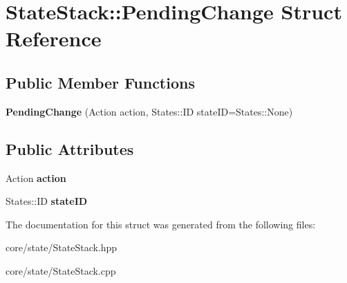 \hypertarget{structStateStack_1_1PendingChange}{\section{\-State\-Stack\-:\-:\-Pending\-Change \-Struct \-Reference}
\label{structStateStack_1_1PendingChange}
}
\subsection*{\-Public \-Member \-Functions}
\begin{DoxyCompactItemize}
\item 
\hypertarget{structStateStack_1_1PendingChange_adf295f13761e75276203d45bd34d984a_adf295f13761e75276203d45bd34d984a}{{\bfseries \-Pending\-Change} (\-Action action, \-States\-::\-I\-D state\-I\-D=\-States\-::\-None)}\label{structStateStack_1_1PendingChange_adf295f13761e75276203d45bd34d984a_adf295f13761e75276203d45bd34d984a}

\end{DoxyCompactItemize}
\subsection*{\-Public \-Attributes}
\begin{DoxyCompactItemize}
\item 
\hypertarget{structStateStack_1_1PendingChange_a58fbc70279f2e72713293808bbabea08_a58fbc70279f2e72713293808bbabea08}{\-Action {\bfseries action}}\label{structStateStack_1_1PendingChange_a58fbc70279f2e72713293808bbabea08_a58fbc70279f2e72713293808bbabea08}

\item 
\hypertarget{structStateStack_1_1PendingChange_a89163ace43e51d5ce8909e8be1e44c5b_a89163ace43e51d5ce8909e8be1e44c5b}{\-States\-::\-I\-D {\bfseries state\-I\-D}}\label{structStateStack_1_1PendingChange_a89163ace43e51d5ce8909e8be1e44c5b_a89163ace43e51d5ce8909e8be1e44c5b}

\end{DoxyCompactItemize}


\-The documentation for this struct was generated from the following files\-:\begin{DoxyCompactItemize}
\item 
core/state/\-State\-Stack.\-hpp\item 
core/state/\-State\-Stack.\-cpp\end{DoxyCompactItemize}
